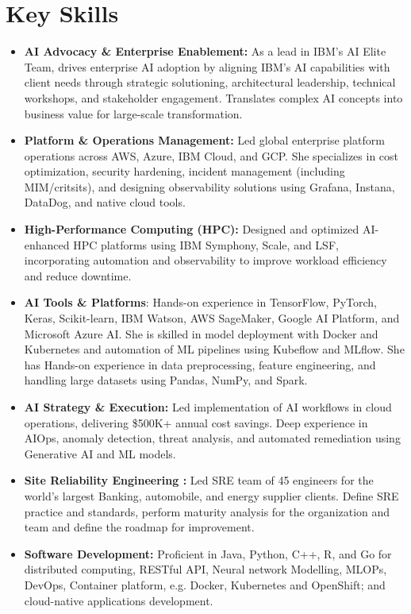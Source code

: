 \documentclass[12pt,parskip=half]{scrartcl}
\begin{document}
\section*{Key Skills}
\begin{itemize}

    \item \textbf{AI Advocacy \& Enterprise Enablement:} As a lead in IBM’s AI Elite Team, drives enterprise AI adoption by aligning IBM's AI capabilities with client needs through strategic solutioning, architectural leadership, technical workshops, and stakeholder engagement. Translates complex AI concepts into business value for large-scale transformation.     
    \item \textbf{Platform \& Operations Management:} Led global enterprise platform operations across AWS, Azure, IBM Cloud, and GCP. She specializes in cost optimization, security hardening, incident management (including MIM/critsits), and designing observability solutions using Grafana, Instana, DataDog, and native cloud tools.
    
    \item \textbf{High-Performance Computing (HPC):} Designed and optimized AI-enhanced HPC platforms using IBM Symphony, Scale, and LSF, incorporating automation and observability to improve workload efficiency and reduce downtime.

    \item \textbf{AI Tools \& Platforms}: Hands-on experience in TensorFlow, PyTorch, Keras, Scikit-learn,  IBM Watson, AWS SageMaker, Google AI Platform, and Microsoft Azure AI. She is skilled in model deployment with Docker and Kubernetes and automation of ML pipelines using Kubeflow and MLflow. She has Hands-on experience in data preprocessing, feature engineering, and handling large datasets using Pandas, NumPy, and Spark.
    \item \textbf{AI Strategy \& Execution:} Led implementation of AI workflows in cloud operations, delivering \$500K+ annual cost savings. Deep experience in AIOps, anomaly detection, threat analysis, and automated remediation using Generative AI and ML models.
    \item \textbf{Site Reliability Engineering :} Led SRE team of 45 engineers for the world's largest Banking, automobile, and energy supplier clients. Define SRE practice and standards, perform maturity analysis for the organization and team and define the roadmap for improvement.   
    
    \item \textbf{Software Development:} Proficient in Java, Python, C++, R, and Go for distributed computing, RESTful API, Neural network Modelling, MLOPs, DevOps, Container platform, e.g. Docker, Kubernetes and OpenShift; and cloud-native applications development.
\end{itemize}
\end{document}
